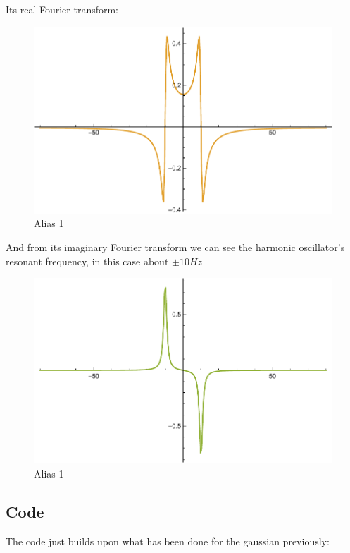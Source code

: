 \documentclass[titlepage]{article}
\begin{document}
Its real Fourier transform:

\begin{figure}[ht]
\centering
\includegraphics[scale=0.8,center]{images/oschre.pdf}
\caption{Alias 1}
\label{fig:2d}
\end{figure}
\FloatBarrier

And from its imaginary Fourier transform we can see the harmonic oscillator's resonant frequency, in this case about $\pm 10Hz$

\begin{figure}[ht]
\centering
\includegraphics[scale=0.8,center]{images/oschim.pdf}
\caption{Alias 1}
\label{fig:2d}
\end{figure}
\FloatBarrier

\subsection{Code}
The code just builds upon what has been done for the gaussian previously:
\end{document}
